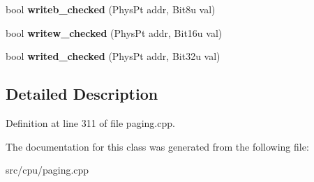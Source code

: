 \begin{DoxyCompactItemize}
\item 
\hypertarget{classPageFoilHandler_a462412f4c5ffe1be2a1854bf34467c0c}{bool {\bfseries writeb\-\_\-checked} (Phys\-Pt addr, Bit8u val)}\label{classPageFoilHandler_a462412f4c5ffe1be2a1854bf34467c0c}

\item 
\hypertarget{classPageFoilHandler_a5ef73b0901678b3239951ffef1728484}{bool {\bfseries writew\-\_\-checked} (Phys\-Pt addr, Bit16u val)}\label{classPageFoilHandler_a5ef73b0901678b3239951ffef1728484}

\item 
\hypertarget{classPageFoilHandler_a4eecbf6af8a3071ceb5c77102464b814}{bool {\bfseries writed\-\_\-checked} (Phys\-Pt addr, Bit32u val)}\label{classPageFoilHandler_a4eecbf6af8a3071ceb5c77102464b814}

\end{DoxyCompactItemize}


\subsection{Detailed Description}


Definition at line 311 of file paging.\-cpp.



The documentation for this class was generated from the following file\-:\begin{DoxyCompactItemize}
\item 
src/cpu/paging.\-cpp\end{DoxyCompactItemize}
